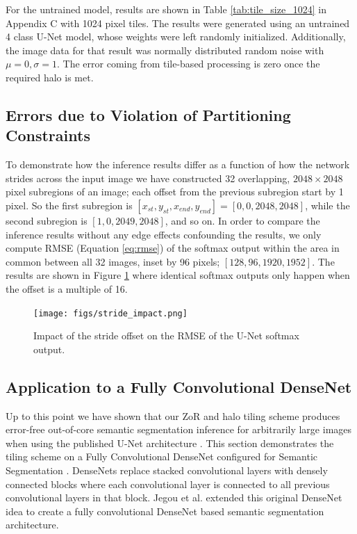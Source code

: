 \documentclass[10pt, indentfirst]{article}
\begin{document}
For the untrained model, results are shown in Table \ref{tab:tile_size_1024} in Appendix C with 1024 pixel tiles.
The results were generated using an untrained 4 class U-Net model, whose weights were left randomly initialized.
Additionally, the image data for that result was normally distributed random noise with $\mu = 0, \sigma = 1$.
The error coming from tile-based processing is zero once the required halo is met.


\subsection{Errors due to Violation of Partitioning Constraints}

To demonstrate how the inference results differ as a function of how the network strides across the input image we have constructed 32 overlapping, $2048 \times 2048$ pixel subregions of an image; each offset from the previous subregion start by 1 pixel.
So the first subregion is $[x_{st}, y_{st}, x_{end}, y_{end}] = [0, 0, 2048, 2048]$, while the second subregion is $[1, 0, 2049, 2048]$, and so on.
In order to compare the inference results without any edge effects confounding the results, we only compute RMSE (Equation \ref{eq:rmse}) of the softmax output within the area in common between all 32 images, inset by 96 pixels; $[128, 96, 1920, 1952]$.
The results are shown in Figure \ref{fig:stride-impact} where identical softmax outputs only happen when the offset is a multiple of 16.

\begin{figure}
	\centering
	\texttt{[image: figs/stride\_impact.png]}
	\caption{Impact of the stride offset on the RMSE of the U-Net softmax output.}
	\label{fig:stride-impact}
\end{figure} 

\subsection{Application to a Fully Convolutional DenseNet}

Up to this point we have shown that our ZoR and halo tiling scheme produces error-free out-of-core semantic segmentation inference for arbitrarily large images when using the published U-Net architecture \citep{Ronneberger2015a}.
This section demonstrates the tiling scheme on a Fully Convolutional DenseNet configured for Semantic Segmentation \citep{Jegou2017}.
DenseNets \citep{Huang2017} replace stacked convolutional layers with densely connected blocks where each convolutional layer is connected to all previous convolutional layers in that block.
Jegou et al. \citep{Jegou2017} extended this original DenseNet idea to create a fully convolutional DenseNet based semantic segmentation architecture.
\end{document}
